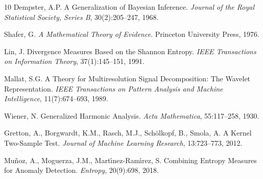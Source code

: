 \documentclass[10pt,twocolumn]{article}
\begin{document}
\begin{thebibliography}{10}
Dempster, A.P.
A Generalization of Bayesian Inference.
\textit{Journal of the Royal Statistical Society, Series B}, 30(2):205--247, 1968.

Shafer, G.
\textit{A Mathematical Theory of Evidence}.
Princeton University Press, 1976.

Lin, J.
Divergence Measures Based on the Shannon Entropy.
\textit{IEEE Transactions on Information Theory}, 37(1):145--151, 1991.

Mallat, S.G.
A Theory for Multiresolution Signal Decomposition: The Wavelet Representation.
\textit{IEEE Transactions on Pattern Analysis and Machine Intelligence}, 11(7):674--693, 1989.

Wiener, N.
Generalized Harmonic Analysis.
\textit{Acta Mathematica}, 55:117--258, 1930.

Gretton, A., Borgwardt, K.M., Rasch, M.J., Sch\"{o}lkopf, B., Smola, A.
A Kernel Two-Sample Test.
\textit{Journal of Machine Learning Research}, 13:723--773, 2012.

Mu\~{n}oz, A., Moguerza, J.M., Mart\'{\i}nez-Ram\'{\i}rez, S.
Combining Entropy Measures for Anomaly Detection.
\textit{Entropy}, 20(9):698, 2018.

\end{thebibliography}
\end{document}
